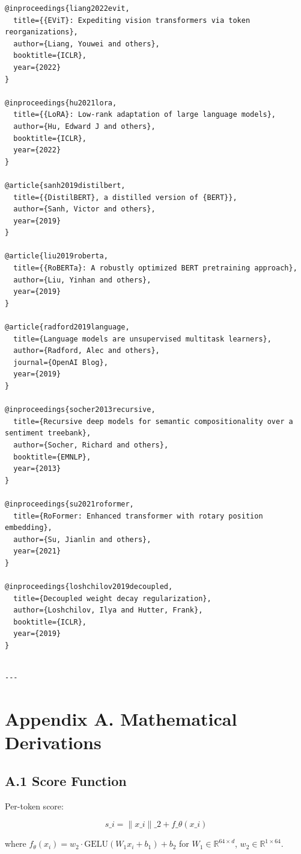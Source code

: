 \begin{lstlisting}
@inproceedings{liang2022evit,
  title={{EViT}: Expediting vision transformers via token reorganizations},
  author={Liang, Youwei and others},
  booktitle={ICLR},
  year={2022}
}

@inproceedings{hu2021lora,
  title={{LoRA}: Low-rank adaptation of large language models},
  author={Hu, Edward J and others},
  booktitle={ICLR},
  year={2022}
}

@article{sanh2019distilbert,
  title={{DistilBERT}, a distilled version of {BERT}},
  author={Sanh, Victor and others},
  year={2019}
}

@article{liu2019roberta,
  title={{RoBERTa}: A robustly optimized BERT pretraining approach},
  author={Liu, Yinhan and others},
  year={2019}
}

@article{radford2019language,
  title={Language models are unsupervised multitask learners},
  author={Radford, Alec and others},
  journal={OpenAI Blog},
  year={2019}
}

@inproceedings{socher2013recursive,
  title={Recursive deep models for semantic compositionality over a sentiment treebank},
  author={Socher, Richard and others},
  booktitle={EMNLP},
  year={2013}
}

@inproceedings{su2021roformer,
  title={RoFormer: Enhanced transformer with rotary position embedding},
  author={Su, Jianlin and others},
  year={2021}
}

@inproceedings{loshchilov2019decoupled,
  title={Decoupled weight decay regularization},
  author={Loshchilov, Ilya and Hutter, Frank},
  booktitle={ICLR},
  year={2019}
}
\end{lstlisting}
\begin{lstlisting}

---
\end{lstlisting}

\section{Appendix A. Mathematical Derivations}

\subsection{A.1 Score Function}

Per-token score:

\[
s\_i = \|x\_i\|\_2 + f\_\theta(x\_i)
\tag{A.1}
\]

where $f_\theta(x_i) = w_2 \cdot \text{GELU}(W_1 x_i + b_1) + b_2$ for 
$W_1 \in \mathbb{R}^{64 \times d}$, $w_2 \in \mathbb{R}^{1 \times 64}$.

